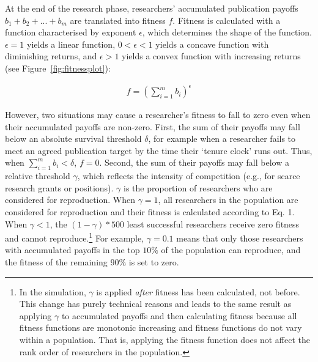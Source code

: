 \documentclass[
  ,man,mask,floatsintext]{apa6}
\begin{document}
At the end of the research phase, researchers' accumulated publication payoffs \(b_1 + b_2 + ... + b_m\) are translated into fitness \(f\).
Fitness is calculated with a function characterised by exponent \(\epsilon\), which determines the shape of the function. \(\epsilon = 1\) yields a linear function, \(0 < \epsilon < 1\) yields a concave function with diminishing returns, and \(\epsilon > 1\) yields a convex function with increasing returns (see Figure~\ref{fig:fitnessplot}):

\begin{align}
f = (\sum_{i=1}^{m} b_i)^\epsilon
\end{align}

However, two situations may cause a researcher's fitness to fall to zero even when their accumulated payoffs are non-zero.
First, the sum of their payoffs may fall below an absolute survival threshold \(\delta\), for example when a researcher fails to meet an agreed publication target by the time their `tenure clock' runs out.
Thus, when \(\sum_{i=1}^{m} b_i < \delta\), \(f = 0\).
Second, the sum of their payoffs may fall below a relative threshold \(\gamma\), which reflects the intensity of competition (e.g., for scarce research grants or positions).
\(\gamma\) is the proportion of researchers who are considered for reproduction.
When \(\gamma = 1\), all researchers in the population are considered for reproduction and their fitness is calculated according to Eq. 1.
When \(\gamma < 1\), the \((1 - \gamma)*500\) least successful researchers receive zero fitness and cannot reproduce.\footnote{In the simulation, \(\gamma\) is applied \emph{after} fitness has been calculated, not before. This change has purely technical reasons and leads to the same result as applying \(\gamma\) to accumulated payoffs and then calculating fitness because all fitness functions are monotonic increasing and fitness functions do not vary within a population. That is, applying the fitness function does not affect the rank order of researchers in the population.}
For example, \(\gamma = 0.1\) means that only those researchers with accumulated payoffs in the top \(10\%\) of the population can reproduce, and the fitness of the remaining \(90\%\) is set to zero.
\end{document}
